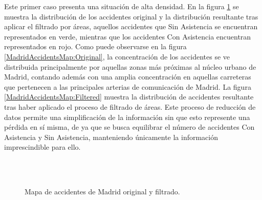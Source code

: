 Este primer caso presenta una situación de alta densidad. En la figura \ref{MadridAccidentsMap} se muestra la distribución de los accidentes original y la distribución resultante tras aplicar el filtrado por áreas, aquellos accidentes que Sin Asistencia se encuentran representados en verde, mientras que los accidentes Con Asistencia encuentran representados en rojo. Como puede observarse en la figura \ref{MadridAccidentsMap:Original}, la concentración de los accidentes se ve distribuida principalmente por aquellas zonas más próximas al núcleo urbano de Madrid, contando además con una amplia concentración en aquellas carreteras que pertenecen a las principales arterias de comunicación de Madrid. La figura  \ref{MadridAccidentsMap:Filtered} muestra la distribución de accidentes resultante tras haber aplicado el proceso de filtrado de áreas. Este proceso de reducción de datos permite una simplificación de la información sin que esto represente una pérdida en sí misma, de ya que se busca equilibrar el número de accidentes Con Asistencia y Sin Asistencia, manteniendo únicamente la información imprescindible para ello.

\begin{figure}[H]
	\centering
	\\
	\\
	\caption{Mapa de accidentes de Madrid original y filtrado.}
	\label{MadridAccidentsMap}
\end{figure}

